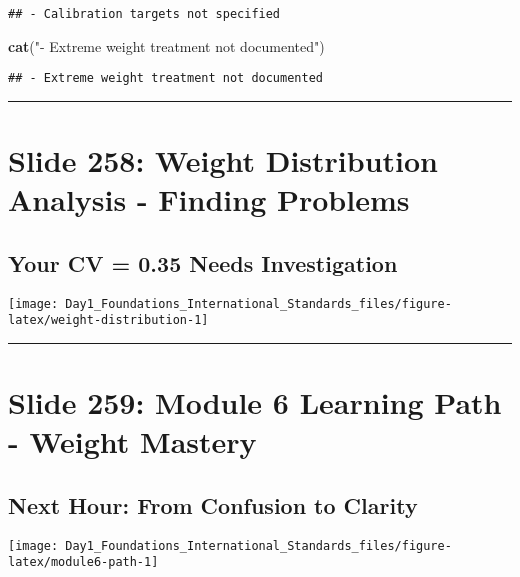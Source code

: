 \documentclass[
]{article}
\newenvironment{Shaded}{\begin{snugshade}}{\end{snugshade}}
\newcommand{\FunctionTok}[1]{\textcolor[rgb]{0.13,0.29,0.53}{\textbf{#1}}}
\newcommand{\NormalTok}[1]{#1}
\newcommand{\StringTok}[1]{\textcolor[rgb]{0.31,0.60,0.02}{#1}}
\begin{document}
\begin{verbatim}
## - Calibration targets not specified
\end{verbatim}

\begin{Shaded}
\begin{Highlighting}[]
\FunctionTok{cat}\NormalTok{(}\StringTok{"{-} Extreme weight treatment not documented"}\NormalTok{)}
\end{Highlighting}
\end{Shaded}

\begin{verbatim}
## - Extreme weight treatment not documented
\end{verbatim}

\begin{center}\rule{0.5\linewidth}{0.5pt}\end{center}

\section{Slide 258: Weight Distribution Analysis - Finding
Problems}\label{slide-258-weight-distribution-analysis---finding-problems}

\subsection{Your CV = 0.35 Needs
Investigation}\label{your-cv-0.35-needs-investigation}

\texttt{[image: Day1\_Foundations\_International\_Standards\_files/figure-latex/weight-distribution-1]}

\begin{center}\rule{0.5\linewidth}{0.5pt}\end{center}

\section{Slide 259: Module 6 Learning Path - Weight
Mastery}\label{slide-259-module-6-learning-path---weight-mastery}

\subsection{Next Hour: From Confusion to
Clarity}\label{next-hour-from-confusion-to-clarity}

\texttt{[image: Day1\_Foundations\_International\_Standards\_files/figure-latex/module6-path-1]}
\end{document}
